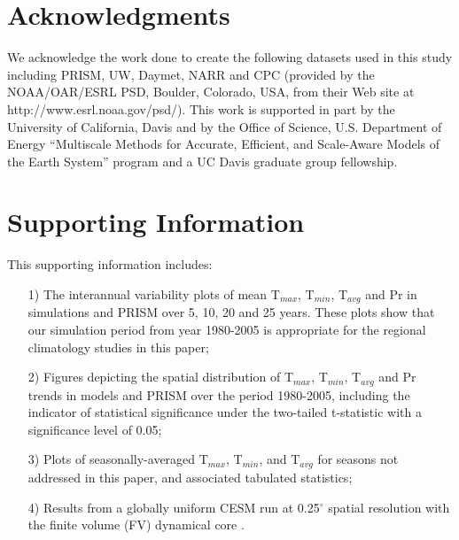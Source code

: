 \section{Acknowledgments}
%

We acknowledge the work done to create the following datasets used in this study including PRISM, UW, Daymet, NARR and CPC (provided by the NOAA/OAR/ESRL PSD, Boulder, Colorado, USA, from their Web site at http://www.esrl.noaa.gov/psd/). This work is supported in part by the University of California, Davis and by the Office of Science, U.S. Department of Energy ``Multiscale Methods for Accurate, Efficient, and Scale-Aware Models of the Earth System'' program and a UC Davis graduate group fellowship.

\section{Supporting Information}

This supporting information includes:

\begin{itemize}

\item[1)] The interannual variability plots of mean T$_{max}$, T$_{min}$, T$_{avg}$ and Pr in simulations and PRISM over 5, 10, 20 and 25 years.  These plots show that our simulation period from year 1980-2005 is appropriate for the regional climatology studies in this paper;

\item[2)] Figures depicting the spatial distribution of T$_{max}$, T$_{min}$, T$_{avg}$ and Pr trends in models and PRISM over the period 1980-2005, including the indicator of statistical significance under the two-tailed t-statistic with a significance level of 0.05;

\item[3)] Plots of seasonally-averaged T$_{max}$, T$_{min}$, and T$_{avg}$ for seasons not addressed in this paper, and associated tabulated statistics;

\item[4)] Results from a globally uniform CESM run at 0.25$^\circ$ spatial resolution with the finite volume (FV) dynamical core \cite{wehner2014effect}.
\end{itemize}


